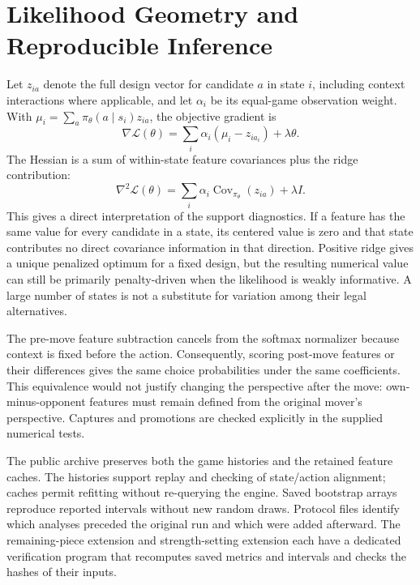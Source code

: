 \section{Likelihood Geometry and Reproducible Inference}
Let $z_{ia}$ denote the full design vector for candidate $a$ in state $i$, including context interactions where applicable, and let $\alpha_i$ be its equal-game observation weight. With $\mu_i=\sum_a\pi_\theta(a\mid s_i)z_{ia}$, the objective gradient is
\begin{equation}
\nabla\mathcal L(\theta)=\sum_i\alpha_i(\mu_i-z_{ia_i})+\lambda\theta.
\end{equation}
The Hessian is a sum of within-state feature covariances plus the ridge contribution:
\begin{equation}
\nabla^2\mathcal L(\theta)=\sum_i\alpha_i\operatorname{Cov}_{\pi_\theta}(z_{ia})+\lambda I.
\end{equation}
This gives a direct interpretation of the support diagnostics. If a feature has the same value for every candidate in a state, its centered value is zero and that state contributes no direct covariance information in that direction. Positive ridge gives a unique penalized optimum for a fixed design, but the resulting numerical value can still be primarily penalty-driven when the likelihood is weakly informative. A large number of states is not a substitute for variation among their legal alternatives.

The pre-move feature subtraction cancels from the softmax normalizer because context is fixed before the action. Consequently, scoring post-move features or their differences gives the same choice probabilities under the same coefficients. This equivalence would not justify changing the perspective after the move: own-minus-opponent features must remain defined from the original mover's perspective. Captures and promotions are checked explicitly in the supplied numerical tests.

The public archive preserves both the game histories and the retained feature caches. The histories support replay and checking of state/action alignment; caches permit refitting without re-querying the engine. Saved bootstrap arrays reproduce reported intervals without new random draws. Protocol files identify which analyses preceded the original run and which were added afterward. The remaining-piece extension and strength-setting extension each have a dedicated verification program that recomputes saved metrics and intervals and checks the hashes of their inputs.
